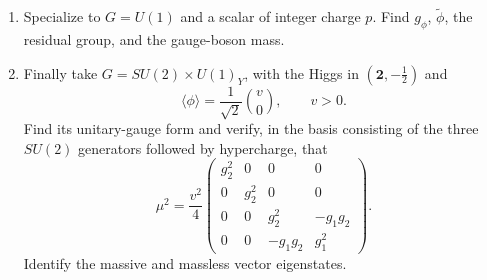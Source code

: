 \begin{enumerate}
\begin{enumerate}
      and show that \(c^a\) is a null vector precisely when
      \(\sum_a g_ac^aT_a\in\mathfrak h\).
    \item Specialize to \(G=U(1)\) and a scalar of integer charge \(p\).
      Find \(g_\phi\), \(\widetilde\phi\), the residual group, and the
      gauge-boson mass.
    \item Finally take \(G=SU(2)\times U(1)_Y\), with the Higgs in
      \((\boldsymbol2,-\tfrac12)\) and
      \[
        \langle\phi\rangle=\frac1{\sqrt2}\binom v0,
        \qquad v>0.
      \]
      Find its unitary-gauge form and verify, in the basis consisting of the
      three \(SU(2)\) generators followed by hypercharge, that
      \[
        \mu^2=\frac{v^2}{4}
        \begin{pmatrix}
          g_2^2&0&0&0\\
          0&g_2^2&0&0\\
          0&0&g_2^2&-g_1g_2\\
          0&0&-g_1g_2&g_1^2
        \end{pmatrix}.
      \]
      Identify the massive and massless vector eigenstates.
  \end{enumerate}

\end{enumerate}
